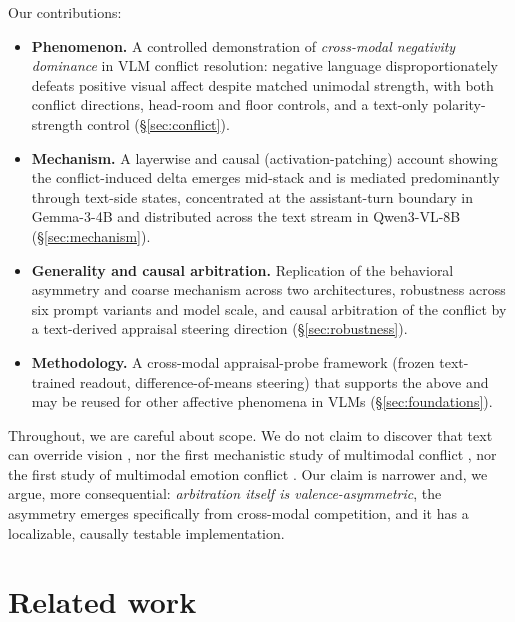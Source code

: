 \documentclass{article}
\newcommand{\gemma}{Gemma-3-4B}
\newcommand{\qwen}{Qwen3-VL-8B}
\begin{document}
Our contributions:
\begin{itemize}
  \item \textbf{Phenomenon.} A controlled demonstration of \emph{cross-modal negativity dominance} in VLM conflict resolution: negative language disproportionately defeats positive visual affect despite matched unimodal strength, with both conflict directions, head-room and floor controls, and a text-only polarity-strength control (\S\ref{sec:conflict}).
  \item \textbf{Mechanism.} A layerwise and causal (activation-patching) account showing the conflict-induced delta emerges mid-stack and is mediated predominantly through text-side states, concentrated at the assistant-turn boundary in \gemma{} and distributed across the text stream in \qwen{} (\S\ref{sec:mechanism}).
  \item \textbf{Generality and causal arbitration.} Replication of the behavioral asymmetry and coarse mechanism across two architectures, robustness across six prompt variants and model scale, and causal arbitration of the conflict by a text-derived appraisal steering direction (\S\ref{sec:robustness}).
  \item \textbf{Methodology.} A cross-modal appraisal-probe framework (frozen text-trained readout, difference-of-means steering) that supports the above and may be reused for other affective phenomena in VLMs (\S\ref{sec:foundations}).
\end{itemize}

Throughout, we are careful about scope. We do not claim to discover that text can override vision \citep{deng2025blindfaith, contextvqa2026}, nor the first mechanistic study of multimodal conflict \citep{seeingoverrides2026}, nor the first study of multimodal emotion conflict \citep{mosear2025}. Our claim is narrower and, we argue, more consequential: \emph{arbitration itself is valence-asymmetric}, the asymmetry emerges specifically from cross-modal competition, and it has a localizable, causally testable implementation.

\section{Related work}
\label{sec:related}
\end{document}

